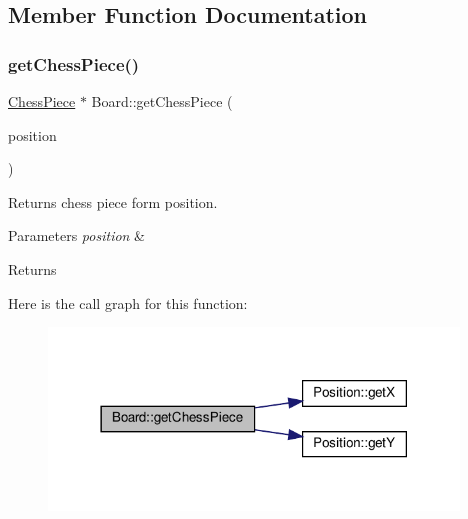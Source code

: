 \subsection{Member Function Documentation}
\mbox{\label{classBoard_aa9344089fc229e9dcc23e58405af14d9}} 
\subsubsection{\texorpdfstring{get\+Chess\+Piece()}{getChessPiece()}}
{\footnotesize\ttfamily \hyperlink{classChessPiece}{Chess\+Piece} $\ast$ Board\+::get\+Chess\+Piece (\begin{DoxyParamCaption}\item[{\hyperlink{classPosition}{Position}}]{position }\end{DoxyParamCaption})}



Returns chess piece form position. 


\begin{DoxyParams}{Parameters}
{\em position} & \\
\hline
\end{DoxyParams}
\begin{DoxyReturn}{Returns}

\end{DoxyReturn}
Here is the call graph for this function\+:\nopagebreak
\begin{figure}[H]
\begin{center}
\leavevmode
\includegraphics[width=309pt]{classBoard_aa9344089fc229e9dcc23e58405af14d9_cgraph}
\end{center}
\end{figure}
\mbox{\label{classBoard_a10531cbaada84808632ae9933c9f1306}} 
